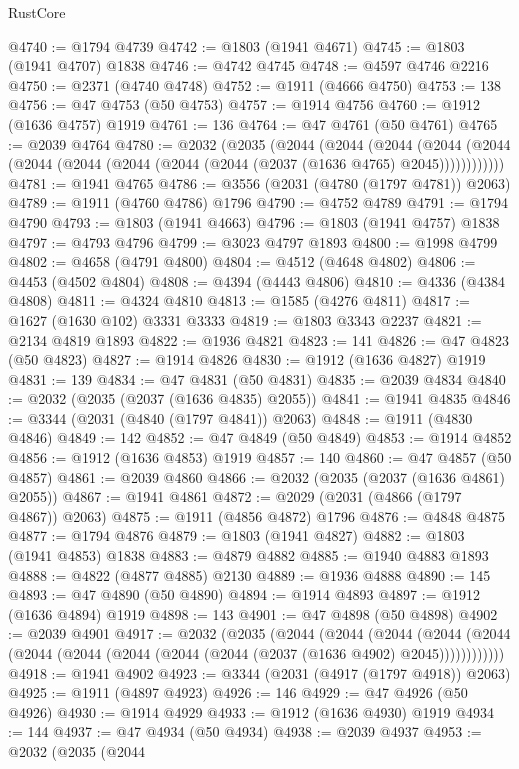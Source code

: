 \begin{lexlean}{RustCore}
\begin{coremodule}
@4740 := @1794 @4739
@4742 := @1803 (@1941 @4671)
@4745 := @1803 (@1941 @4707) @1838
@4746 := @4742 @4745
@4748 := @4597 @4746 @2216
@4750 := @2371 (@4740 @4748)
@4752 := @1911 (@4666 @4750)
@4753 := 138
@4756 := @47 @4753 (@50 @4753)
@4757 := @1914 @4756
@4760 := @1912 (@1636 @4757) @1919
@4761 := 136
@4764 := @47 @4761 (@50 @4761)
@4765 := @2039 @4764
@4780 := @2032
    (@2035
      (@2044
        (@2044
          (@2044
            (@2044 (@2044 (@2044 (@2044 (@2044 (@2044 (@2044 (@2037 (@1636 @4765) @2045))))))))))))
@4781 := @1941 @4765
@4786 := @3556 (@2031 (@4780 (@1797 @4781)) @2063)
@4789 := @1911 (@4760 @4786) @1796
@4790 := @4752 @4789
@4791 := @1794 @4790
@4793 := @1803 (@1941 @4663)
@4796 := @1803 (@1941 @4757) @1838
@4797 := @4793 @4796
@4799 := @3023 @4797 @1893
@4800 := @1998 @4799
@4802 := @4658 (@4791 @4800)
@4804 := @4512 (@4648 @4802)
@4806 := @4453 (@4502 @4804)
@4808 := @4394 (@4443 @4806)
@4810 := @4336 (@4384 @4808)
@4811 := @4324 @4810
@4813 := @1585 (@4276 @4811)
@4817 := @1627 (@1630 @102) @3331 @3333
@4819 := @1803 @3343 @2237
@4821 := @2134 @4819 @1893
@4822 := @1936 @4821
@4823 := 141
@4826 := @47 @4823 (@50 @4823)
@4827 := @1914 @4826
@4830 := @1912 (@1636 @4827) @1919
@4831 := 139
@4834 := @47 @4831 (@50 @4831)
@4835 := @2039 @4834
@4840 := @2032 (@2035 (@2037 (@1636 @4835) @2055))
@4841 := @1941 @4835
@4846 := @3344 (@2031 (@4840 (@1797 @4841)) @2063)
@4848 := @1911 (@4830 @4846)
@4849 := 142
@4852 := @47 @4849 (@50 @4849)
@4853 := @1914 @4852
@4856 := @1912 (@1636 @4853) @1919
@4857 := 140
@4860 := @47 @4857 (@50 @4857)
@4861 := @2039 @4860
@4866 := @2032 (@2035 (@2037 (@1636 @4861) @2055))
@4867 := @1941 @4861
@4872 := @2029 (@2031 (@4866 (@1797 @4867)) @2063)
@4875 := @1911 (@4856 @4872) @1796
@4876 := @4848 @4875
@4877 := @1794 @4876
@4879 := @1803 (@1941 @4827)
@4882 := @1803 (@1941 @4853) @1838
@4883 := @4879 @4882
@4885 := @1940 @4883 @1893
@4888 := @4822 (@4877 @4885) @2130
@4889 := @1936 @4888
@4890 := 145
@4893 := @47 @4890 (@50 @4890)
@4894 := @1914 @4893
@4897 := @1912 (@1636 @4894) @1919
@4898 := 143
@4901 := @47 @4898 (@50 @4898)
@4902 := @2039 @4901
@4917 := @2032
    (@2035
      (@2044
        (@2044
          (@2044
            (@2044 (@2044 (@2044 (@2044 (@2044 (@2044 (@2044 (@2037 (@1636 @4902) @2045))))))))))))
@4918 := @1941 @4902
@4923 := @3344 (@2031 (@4917 (@1797 @4918)) @2063)
@4925 := @1911 (@4897 @4923)
@4926 := 146
@4929 := @47 @4926 (@50 @4926)
@4930 := @1914 @4929
@4933 := @1912 (@1636 @4930) @1919
@4934 := 144
@4937 := @47 @4934 (@50 @4934)
@4938 := @2039 @4937
@4953 := @2032
    (@2035
      (@2044

\end{coremodule}
\end{lexlean}
